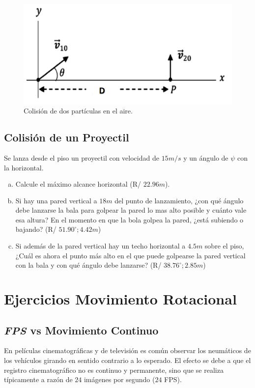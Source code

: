 \documentclass{replab}
\begin{document}
\begin{figure}[htbp]
	\centering
	\includegraphics[width=.4\columnwidth]{imagenes/interception.png}
	\caption{Colisión de dos partículas en el aire.}
	\label{fig:interception}
\end{figure}

\subsection{Colisión de un Proyectil}
Se lanza desde el piso un proyectil con velocidad de $15m/s$ y un ángulo de $\psi$ con la horizontal.

\begin{enumerate}[a)]
	\item Calcule el máximo alcance horizontal (R/ $22.96m$).
	\item Si hay una pared vertical a $18m$ del punto de lanzamiento, ¿con qué ángulo debe lanzarse la bala para golpear la pared lo mas alto posible y cuánto vale esa altura? En el momento en que la bola golpea la pared, ¿está subiendo o bajando? (R/ $51.90^{\circ}; 4.42m$)
	\item Si además de la pared vertical hay un techo horizontal a $4.5m$ sobre el piso, ¿Cuál es ahora el punto más alto en el que puede golpearse la pared vertical con la bala y con qué ángulo debe lanzarse? (R/ $38.76^{\circ}; 2.85m$)
\end{enumerate}

\section{Ejercicios Movimiento Rotacional}

\subsection{\textit{FPS} vs Movimiento Continuo}

	En películas cinematográficas y de televisión es común observar los neumáticos de los vehículos girando en sentido contrario a lo esperado. El efecto se debe a que el registro cinematográfico no es continuo y permanente, sino que se realiza típicamente a razón de $24$ imágenes por segundo ($24$ FPS).
\end{document}
